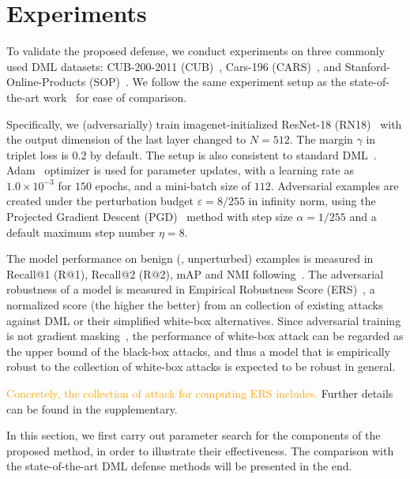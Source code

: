\documentclass[10pt,twocolumn,letterpaper]{article}
\newcommand{\oo}[1]{\textcolor{orange}{#1}}
\begin{document}
\section{Experiments}
\label{sec:4}


To validate the proposed defense, we conduct experiments
on three commonly used DML datasets: CUB-200-2011 (CUB)~\cite{cub200}, Cars-196
(CARS)~\cite{cars196}, and Stanford-Online-Products (SOP)~\cite{sop}.
%
We follow the same experiment setup as the state-of-the-art work~\cite{robrank}
for ease of comparison.


Specifically, we (adversarially) train imagenet-initialized ResNet-18
(RN18)~\cite{resnet} with the output dimension of the last layer changed to
$N{=}512$.
%
The margin $\gamma$ in triplet loss is $0.2$ by default.
%
The setup is also consistent to standard DML~\cite{revisiting}.
%
Adam~\cite{adam} optimizer is used for parameter updates, with a learning rate
as $1.0{\times}10^{-3}$ for $150$ epochs, and a mini-batch size of $112$.
%
Adversarial examples are created under the perturbation budget
$\varepsilon{=}8/255$ in infinity norm, using the
Projected Gradient Descent (PGD)~\cite{madry} method with step size $\alpha{=}1/255$ 
and a default maximum step number $\eta{=}8$.
%

The model performance on benign (\ie, unperturbed) examples is measured in
Recall@1 (R@1), Recall@2 (R@2), mAP and NMI
following~\cite{revisiting,robrank}.
%
The adversarial robustness of a model is measured in Empirical Robustness Score
(ERS)~\cite{robrank}, a normalized score (the higher the better) from
an collection of existing attacks against DML or their simplified white-box
alternatives.
%
Since adversarial training is not gradient masking~\cite{obfuscated}, the
performance of white-box attack can be regarded as the upper bound of the
black-box attacks, and thus a model that is empirically robust to the collection
of white-box attacks is expected to be robust in general.

\oo{Concretely, the collection of attack for computing ERS includes.}
%
Further details can be found in the supplementary.

In this section, we first carry out parameter search for the components of the
proposed method, in order to illustrate their effectiveness.
%
The comparison with the state-of-the-art DML defense methods will be presented in the end.
\end{document}
